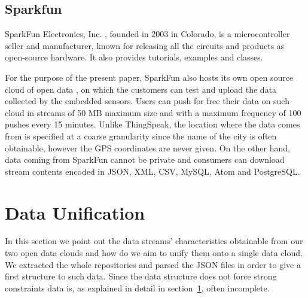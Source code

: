 \documentclass[conference]{IEEEtran}
\begin{document}
\subsection{Sparkfun}
SparkFun Electronics, Inc. \cite{sparkfun}, founded in 2003 in Colorado, is a microcontroller seller and manufacturer, known for releasing all the circuits and products as open-source hardware.
It also provides tutorials, examples and classes.

For the purpose of the present paper, SparkFun also hosts its own open source cloud of open data \cite{sparkfundata}, on which the customers can test and upload the data collected by the embedded sensors.
Users can push for free their data on such cloud in streams of 50 MB maximum size and with a maximum frequency of 100 pushes every 15 minutes.
Unlike ThingSpeak, the location where the data comes from is specified at a coarse granularity since the name of the city is often obtainable, however the GPS coordinates are never given.
On the other hand, data coming from SparkFun cannot be private and consumers can download stream contents encoded in JSON, XML, CSV, MySQL, Atom and PostgreSQL.

\section{Data Unification}
\label{unification}
In this section we point out the data streams' characteristics obtainable from our two open data clouds and how do we aim to unify them onto a single data cloud.
We extracted the whole repositories and parsed the JSON files in order to give a first structure to such data.
Since the data structure does not force strong constraints data is, as explained in detail in section~\ref{unification}, often incomplete.
\end{document}
